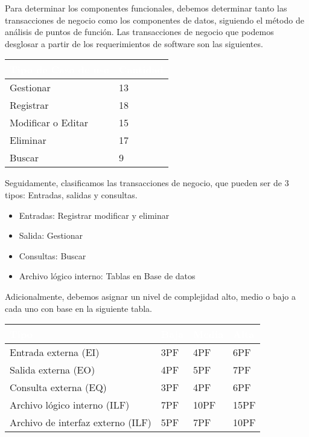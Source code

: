 Para determinar los componentes funcionales, debemos determinar tanto las transacciones de negocio como los componentes de datos, siguiendo el método de análisis de puntos de función.  Las transacciones de negocio que podemos desglosar a partir de los requerimientos de software son las siguientes.

\begin{table}[H]
	\centering
	\begin{tabular}{|p{4cm}|p{4cm}|}
		\hline
		\rowcolor{black} \textcolor{white} {\textbf{Tipo de Caso de uso}} & \textcolor{white}{\textbf{Cantidad}} \\ \hline
		Gestionar & 13  \\
		\hline
		Registrar & 18  \\
		\hline
		Modificar o Editar & 15  \\
		\hline
		Eliminar & 17  \\
		\hline
		Buscar & 9  \\
		\hline
	\end{tabular}
\end{table}

Seguidamente, clasificamos las transacciones de negocio, que pueden ser de 3 tipos: Entradas, salidas y consultas. 

\begin{itemize}
\item Entradas: Registrar modificar y eliminar
\item Salida: Gestionar
\item Consultas: Buscar
\item Archivo lógico interno: Tablas en Base de datos

\end{itemize}

Adicionalmente, debemos asignar un nivel de complejidad alto, medio o bajo a cada uno con base en la siguiente tabla.

	\begin{table}[H]
	\centering
	\begin{tabular}{|p{3cm}|p{1cm}|p{1cm}|p{1cm}|}
		\hline
		\rowcolor{black} \textcolor{white} {\textbf{Tipo}} & \textcolor{white}{\textbf{Baja}} & \textcolor{white}{\textbf{Media}} & \textcolor{white}{\textbf{Alta}} \\ \hline
		Entrada  externa (EI) & 3PF & 4PF & 6PF  \\
		\hline
		Salida  externa (EO) & 4PF & 5PF & 7PF  \\
		\hline
		Consulta  externa (EQ) & 3PF & 4PF & 6PF  \\
		\hline
		Archivo lógico interno (ILF) & 7PF & 10PF & 15PF  \\
		\hline
		Archivo de interfaz externo (ILF) & 5PF & 7PF & 10PF  \\
		\hline
	\end{tabular}
\end{table}

